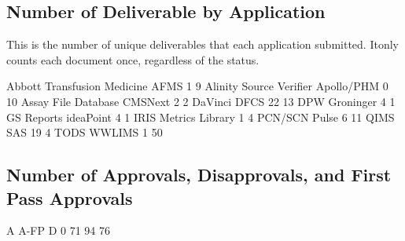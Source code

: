 \documentclass{article}
\begin{document}
\subsection{Number of Deliverable by Application}
This is the number of unique deliverables that each application submitted. Itonly counts
each document once, regardless of the status.
\begin{Schunk}
\begin{Soutput}
Abbott Transfusion Medicine                        AFMS 
                          1                           9 
    Alinity Source Verifier                  Apollo/PHM 
                          0                          10 
        Assay File Database                     CMSNext 
                          2                           2 
                    DaVinci                        DFCS 
                         22                          13 
                        DPW                   Groninger 
                          4                           1 
                 GS Reports                   ideaPoint 
                          4                           1 
                       IRIS             Metrics Library 
                          1                           4 
                    PCN/SCN                       Pulse 
                          6                          11 
                       QIMS                         SAS 
                         19                           4 
                       TODS                      WWLIMS 
                          1                          50 
\end{Soutput}
\end{Schunk}

\subsection{Number of Approvals, Disapprovals, and First Pass Approvals}

\begin{Schunk}
\begin{Soutput}
        A A-FP    D 
   0   71   94   76 
\end{Soutput}
\end{Schunk}
\end{document}
